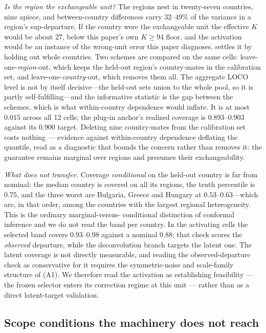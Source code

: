 \documentclass[12pt]{article}
\theoremstyle{definition}
\theoremstyle{remark}
\begin{document}
\emph{Is the region the exchangeable unit?} The regions nest in twenty-seven
countries, nine apiece, and between-country differences carry
$32$--$49\%$ of the variance in a region's sup-departure. If the
country were the exchangeable unit the effective $K$ would be about $27$, below
this paper's own $K\ge94$ floor, and the activation would be an instance of the
wrong-unit error this paper diagnoses. settles it by
holding out whole countries. Two schemes are compared on the same cells:
leave-one-\emph{region}-out, which keeps the held-out region's country-mates in
the calibration set, and leave-one-\emph{country}-out, which removes them all.
The aggregate LOCO level is not by itself decisive---the held-out sets union to
the whole pool, so it is partly self-fulfilling---and the informative statistic
is the gap between the schemes, which is what within-country dependence would
inflate. It is at most $0.015$ across all 12 cells; the plug-in
anchor's realized coverage is $0.893$--$0.903$ against its $0.900$
target. Deleting nine country-mates from the calibration set costs nothing ---
evidence against within-country dependence deflating the quantile, read as a
diagnostic that bounds the concern rather than removes it: the guarantee
remains marginal over regions and presumes their exchangeability.

\emph{What does not transfer.} Coverage \emph{conditional} on the held-out
country is far from nominal: the median country is covered on all its regions,
the tenth percentile is $0.75$, and the three worst are Bulgaria, Greece and
Hungary at $0.53$--$0.63$---which are, in that order, among the countries
with the largest regional heterogeneity. This is the ordinary marginal-versus-
conditional distinction of conformal inference and we do not read the band per
country. In the activating cells the selected band covers
$0.93$--$0.98$ against a nominal $0.88$; that check scores the
\emph{observed} departure, while the deconvolution branch targets the latent
one. The latent coverage is not directly measurable, and reading the
observed-departure check as conservative for it requires the symmetric-noise
and scale-family structure of (A1). We therefore read the activation as
establishing feasibility --- the frozen selector enters its correction regime
at this unit --- rather than as a direct latent-target validation.


\subsection{Scope conditions the machinery does not reach}
\end{document}
